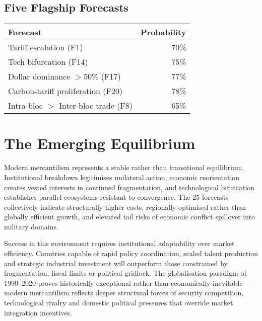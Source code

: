 \documentclass{article}
\begin{document}
\subsection*{Five Flagship Forecasts}
\vspace{-5pt}
\small
\begin{center}
\begin{tabular}{lr}
\toprule
\textbf{Forecast} & \textbf{Probability} \\
\midrule
Tariff escalation (F1) & 70\% \\
Tech bifurcation (F14) & 75\% \\
Dollar dominance $>50\%$ (F17) & 77\% \\
Carbon‑tariff proliferation (F20) & 78\% \\
Intra‑bloc $>$ Inter‑bloc trade (F8) & 65\% \\
\bottomrule
\end{tabular}
\end{center}


\section{The Emerging Equilibrium}

Modern mercantilism represents a stable rather than transitional equilibrium.  Institutional breakdown legitimises unilateral action, economic reorientation creates vested interests in continued fragmentation, and technological bifurcation establishes parallel ecosystems resistant to convergence.  The 25 forecasts collectively indicate structurally higher costs, regionally optimised rather than globally efficient growth, and elevated tail risks of economic conflict spillover into military domains.

Success in this environment requires institutional adaptability over market efficiency.  Countries capable of rapid policy coordination, scaled talent production and strategic industrial investment will outperform those constrained by fragmentation, fiscal limits or political gridlock.  The globalisation paradigm of 1990–2020 proves historically exceptional rather than economically inevitable — modern mercantilism reflects deeper structural forces of security competition, technological rivalry and domestic political pressures that override market integration incentives.
\end{document}
